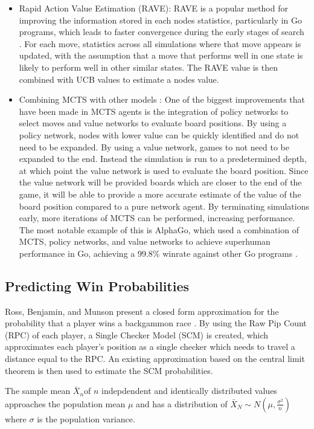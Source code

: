 \begin{itemize}
    \item Rapid Action Value Estimation (RAVE): RAVE is a popular method for improving the information stored in each nodes statistics, particularly in Go programs, which leads to faster convergence during the early stages of search \cite{GellySilver2007}. For each move, statistics across all simulations where that move appears is updated, with the assumption that a move that performs well in one state is likely to perform well in other similar states. The RAVE value is then combined with UCB values to estimate a nodes value.


    \item Combining MCTS with other models \cite{44806} \cite{Browne2012}: 
    One of the biggest improvements that have been made in MCTS agents is the integration of policy networks to select moves and value networks to evaluate board positions. 
    By using a policy network, nodes with lower value can be quickly identified and do not need to be expanded.
    By using a value network, games to not need to be expanded to the end.
    Instead the simulation is run to a predetermined depth, at which point the value network is used to evaluate the board position.
    Since the value network will be provided boards which are closer to the end of the game, it will be able to provide a more accurate estimate of the value of the board position compared to a pure network agent.
    By terminating simulations early, more iterations of MCTS can be performed, increasing performance. The most notable example of this is AlphaGo, which used a combination of MCTS, policy networks, and value networks to achieve superhuman performance in Go, achieving a 99.8\% winrate against other Go programs \cite{44806}.
 
\end{itemize} 

\subsection{Predicting Win Probabilities}
Ross, Benjamin, and Munson present a closed form approximation for the probability that a player wins a backgammon race \cite{estimating}.
By using the Raw Pip Count (RPC) of each player, a Single Checker Model (SCM) is created, which approximates each player's position as a single checker which needs to travel a distance equal to the RPC.
An existing approximation based on the central limit theorem is then used to estimate the SCM probabilities. 

\begin{definition}
The sample mean $\bar X_n $of $n$ indepdendent and identically distributed values approaches the population mean $\mu$ and has a distribution of $\bar X_N \sim N(\mu, \frac{\sigma^2}{n})$ where $\sigma$ is the population variance.    
\end{definition}


